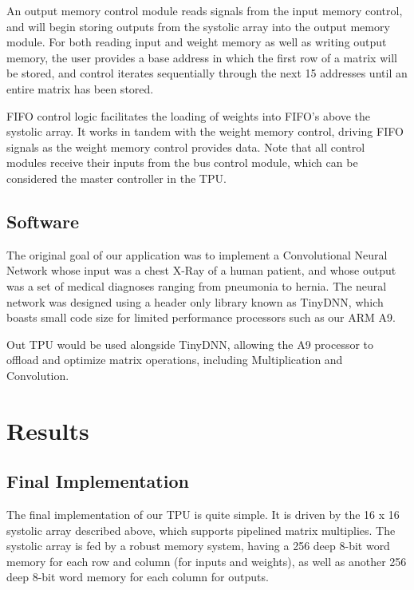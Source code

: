 \documentclass[11pt, conference, onecolumn]{IEEEtran}
\begin{document}
        An output memory control module reads signals from the input memory control, and
        will begin storing outputs from the systolic array into the output memory module.
        For both reading input and weight memory as well as writing output memory, the
        user provides a base address in which the first row of a matrix will be stored,
        and control iterates sequentially through the next 15 addresses until an entire
        matrix has been stored.

        FIFO control logic facilitates the loading of weights into FIFO's above the
        systolic array. It works in tandem with the weight memory control, driving FIFO
        signals as the weight memory control provides data. Note that all control
        modules receive their inputs from the bus control module, which can be considered
        the master controller in the TPU.

    \subsection{Software}
        The original goal of our application was to implement a Convolutional Neural
        Network whose input was a chest X-Ray of a human patient, and whose output was a
        set of medical diagnoses ranging from pneumonia to hernia. The neural network
        was designed using a header only library known as TinyDNN, which boasts small
        code size for limited performance processors such as our ARM A9.


        Out TPU would be used alongside TinyDNN, allowing the A9 processor to offload and
        optimize matrix operations, including Multiplication and Convolution.

\section{Results}
    \subsection{Final Implementation}
        The final implementation of our TPU is quite simple. It is driven by the 16 x 16
        systolic array described above, which supports pipelined matrix multiplies. The
        systolic array is fed by a robust memory system, having a 256 deep 8-bit word
        memory for each row and column (for inputs and weights), as well as another 256
        deep 8-bit word memory for each column for outputs.
\end{document}
